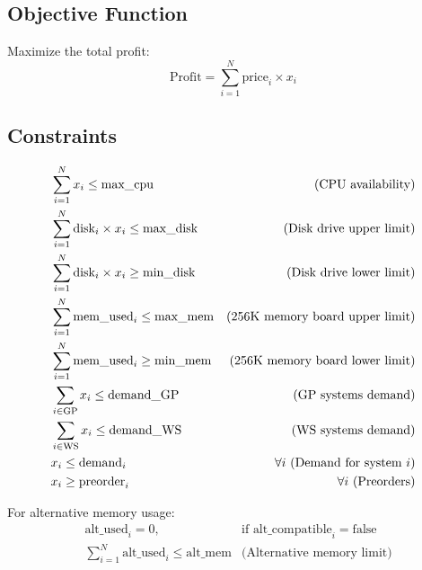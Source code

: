 \documentclass{article}
\begin{document}
\subsection*{Objective Function}
Maximize the total profit:
\[
\text{Profit} = \sum_{i=1}^{N} \text{price}_i \times x_i
\]

\subsection*{Constraints}
\begin{align}
    & \sum_{i=1}^{N} x_i \leq \text{max\_cpu} & \text{(CPU availability)} \\
    & \sum_{i=1}^{N} \text{disk}_i \times x_i \leq \text{max\_disk} & \text{(Disk drive upper limit)} \\
    & \sum_{i=1}^{N} \text{disk}_i \times x_i \geq \text{min\_disk} & \text{(Disk drive lower limit)} \\
    & \sum_{i=1}^{N} \text{mem\_used}_i \leq \text{max\_mem} & \text{(256K memory board upper limit)} \\
    & \sum_{i=1}^{N} \text{mem\_used}_i \geq \text{min\_mem} & \text{(256K memory board lower limit)} \\
    & \sum_{i \in \text{GP}} x_i \leq \text{demand\_GP} & \text{(GP systems demand)} \\
    & \sum_{i \in \text{WS}} x_i \leq \text{demand\_WS} & \text{(WS systems demand)} \\
    & x_i \leq \text{demand}_i & \forall i \text{ (Demand for system \( i \))} \\
    & x_i \geq \text{preorder}_i & \forall i \text{ (Preorders)}

\end{align}

For alternative memory usage:
\begin{align}
    & \text{alt\_used}_i = 0, & \text{if }\text{alt\_compatible}_i = \text{false} \\
    & \sum_{i=1}^{N} \text{alt\_used}_i \leq \text{alt\_mem} & \text{(Alternative memory limit)}
\end{align}
\end{document}
